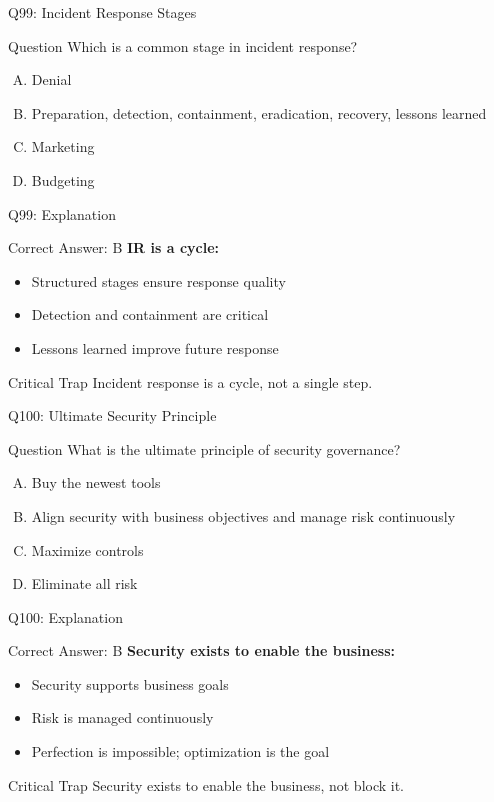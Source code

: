 \documentclass{beamer}
\begin{document}
	\begin{frame}{Q99: Incident Response Stages}
		\begin{block}{Question}
			Which is a common stage in incident response?
		\end{block}
		\begin{enumerate}[(A)]
			\item Denial
			\item Preparation, detection, containment, eradication, recovery, lessons learned
			\item Marketing
			\item Budgeting
		\end{enumerate}
	\end{frame}
	
	\begin{frame}{Q99: Explanation}
		\begin{block}{Correct Answer: B}
			\textbf{IR is a cycle:}
			\begin{itemize}
				\item Structured stages ensure response quality
				\item Detection and containment are critical
				\item Lessons learned improve future response
			\end{itemize}
		\end{block}
		\begin{alertblock}{Critical Trap}
			Incident response is a cycle, not a single step.
		\end{alertblock}
	\end{frame}
	
	\begin{frame}{Q100: Ultimate Security Principle}
		\begin{block}{Question}
			What is the ultimate principle of security governance?
		\end{block}
		\begin{enumerate}[(A)]
			\item Buy the newest tools
			\item Align security with business objectives and manage risk continuously
			\item Maximize controls
			\item Eliminate all risk
		\end{enumerate}
	\end{frame}
	
	\begin{frame}{Q100: Explanation}
		\begin{block}{Correct Answer: B}
			\textbf{Security exists to enable the business:}
			\begin{itemize}
				\item Security supports business goals
				\item Risk is managed continuously
				\item Perfection is impossible; optimization is the goal
			\end{itemize}
		\end{block}
		\begin{alertblock}{Critical Trap}
			Security exists to enable the business, not block it.
		\end{alertblock}
	\end{frame}
	
\end{document}
